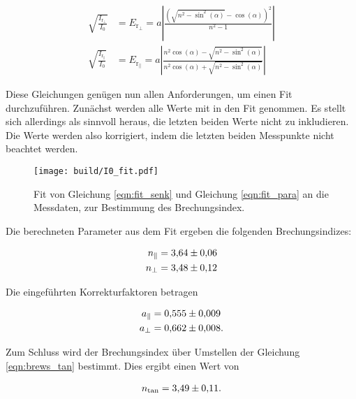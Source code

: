\begin{align}
    \sqrt{\frac{I_{\text{r}_\bot}}{I_0}} &= E_{\text{r}_\bot} = a \left| \frac{\left( \sqrt{n^2 - \sin^2(\alpha)} - \cos(\alpha) \right)^2}{ n^2 -1 } \right| 
    \label{eqn:fit_senk}\\
    \sqrt{\frac{I_{\text{r}_\parallel}}{I_0}} &= E_{\text{r}_\parallel} = a \left| \frac{n^2 \cos(\alpha) - \sqrt{n^2 - \sin^2(\alpha)} }{ n^2 \cos(\alpha) + \sqrt{n^2 - \sin^2(\alpha)}} \right|
    \label{eqn:fit_para}
\end{align}

\noindent Diese Gleichungen genügen nun allen Anforderungen, um einen Fit durchzuführen. Zunächst werden alle Werte mit in den Fit genommen. Es stellt sich allerdings als sinnvoll 
heraus, die letzten beiden Werte nicht zu inkludieren. Die Werte werden also korrigiert, indem die letzten beiden Messpunkte nicht beachtet werden.


\begin{figure}[H]
    \centering
    \texttt{[image: build/I0\_fit.pdf]}
    \caption{Fit von Gleichung \eqref{eqn:fit_senk} und Gleichung \eqref{eqn:fit_para} an die Messdaten, zur Bestimmung des Brechungsindex. }
\end{figure}

\noindent Die berechneten Parameter aus dem Fit ergeben die folgenden Brechungsindizes:

\begin{align*}
    n_\parallel &= \num{3.64 \pm 0.06}\\
    n_\bot      &= \num{3.48 \pm 0.12}
\end{align*}

\noindent Die eingeführten Korrekturfaktoren betragen  

\begin{align*}
    a_\parallel &= \num{0.555 \pm 0.009}\\
    a_\bot      &= \num{0.662 \pm 0.008}.
\end{align*}

\noindent Zum Schluss wird der Brechungsindex über Umstellen der Gleichung \eqref{eqn:brews_tan} bestimmt. Dies ergibt einen Wert von 

\begin{align*}
    n_\text{tan} = \num{3.49\pm0.11}.
\end{align*}


%
